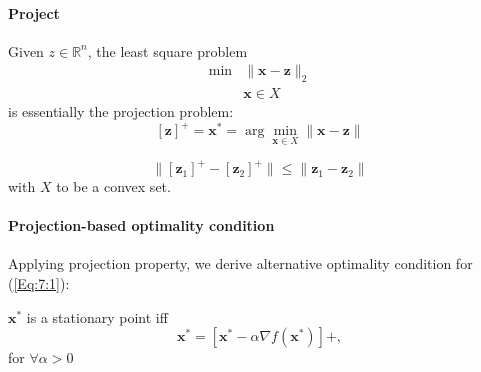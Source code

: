 \paragraph{Project}
Given $z\in\mathbb{R}^n$, the least square problem
\[
\begin{array}{ll}
\min&\|\bm x-\bm z\|_2\\
&\bm x\in X
\end{array}
\]
is essentially the projection problem:
\[
[\bm z]^+=\bm x^*=\arg\min_{\bm x\in X}\|\bm x-\bm z\|
\]
\begin{proposition}
\[
\|[\bm z_1]^+ - [\bm z_2]^+\|\le\|\bm z_1-\bm z_2\|
\]
with $X$ to be a convex set.
\end{proposition}
\paragraph{Projection-based optimality condition}
Applying projection property, we derive alternative optimality condition for (\ref{Eq:7:1}):
\begin{proposition}
$\bm x^*$ is a stationary point iff
\[
\bm x^*=[\bm x^*-\alpha\nabla f(\bm x^*)]+,
\]
for $\forall\alpha>0$
\end{proposition}









